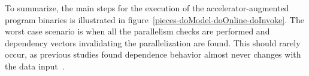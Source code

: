 To summarize, the main steps for the execution of the accelerator-augmented program binaries is illustrated in figure~\ref{pieces-doModel-doOnline-doInvoke}. %
The worst case scenario is  when all the parallelism checks are performed and dependency vectors invalidating the parallelization are found. This should rarely occur, as previous studies found dependence behavior almost never changes with the data input~\cite{Tournavitis:2009:THA:1542476.1542496}\cite{Bhattacharyya:2013:IMU:2523721.2523775}.





